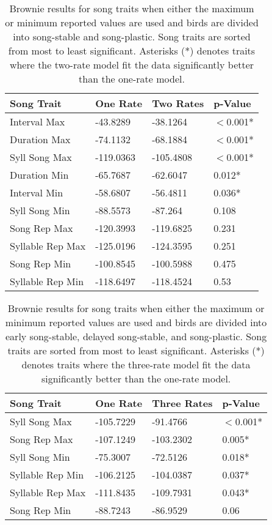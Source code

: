 \documentclass[a4paper,12pt]{article}
\begin{document}
\begin{table}[ht]
\caption{Brownie results for song traits when either the maximum or minimum reported values are used and birds are divided into song-stable and song-plastic. Song traits are sorted from most to least significant. Asterisks (*) denotes traits where the two-rate model fit the data significantly better than the one-rate model.}
\centering
\begin{tabular}{llll}
  \hline
Song Trait & One Rate & Two Rates & p-Value \\ 
  \hline
Interval Max & -43.8289 & -38.1264 & $<$0.001* \\ 
  Duration Max & -74.1132 & -68.1884 & $<$0.001* \\ 
  Syll Song Max & -119.0363 & -105.4808 & $<$0.001* \\ 
  Duration Min & -65.7687 & -62.6047 & 0.012* \\ 
  Interval Min & -58.6807 & -56.4811 & 0.036* \\ 
  Syll Song Min & -88.5573 & -87.264 & 0.108 \\ 
  Song Rep Max & -120.3993 & -119.6825 & 0.231 \\ 
  Syllable Rep Max & -125.0196 & -124.3595 & 0.251 \\ 
  Song Rep Min & -100.8545 & -100.5988 & 0.475 \\ 
  Syllable Rep Min & -118.6497 & -118.4524 & 0.53 \\ 
   \hline
\end{tabular}
\end{table}



\begin{table}[ht]
\caption{Brownie results for song traits when either the maximum or minimum reported values are used and birds are divided into  early song-stable, delayed song-stable, and song-plastic. Song traits are sorted from most to least significant. Asterisks (*) denotes traits where the three-rate model fit the data significantly better than the one-rate model.}
\centering
\begin{tabular}{llll}
  \hline
Song Trait & One Rate & Three Rates & p-Value \\ 
  \hline
  Syll Song Max & -105.7229 & -91.4766 & $<$0.001* \\ 
  Song Rep Max & -107.1249 & -103.2302 & 0.005* \\ 
  Syll Song Min & -75.3007 & -72.5126 & 0.018* \\ 
  Syllable Rep Min & -106.2125 & -104.0387 & 0.037* \\ 
  Syllable Rep Max & -111.8435 & -109.7931 & 0.043* \\ 
  Song Rep Min & -88.7243 & -86.9529 & 0.06 \\ 
   \hline
\end{tabular}
\end{table}
\end{document}
